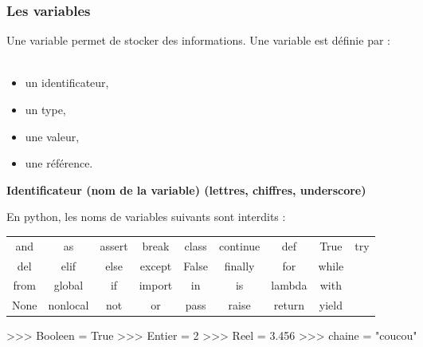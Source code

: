 \begin{frame}[fragile]
\frametitle{Les variables}

Une variable permet de stocker des informations. Une variable est définie par :
\\ ~\ \\
\begin{minipage}{0.45\linewidth}
\begin{itemize}
 \item un identificateur,
 \item un type,
\end{itemize}
\end{minipage}\hfill
\begin{minipage}{0.45\linewidth}
\begin{itemize}
 \item une valeur,
 \item une référence.
\end{itemize}
\end{minipage}

\textbf{Identificateur (nom de la variable) (lettres, chiffres, underscore)}
\begin{rem}
En python, les noms de variables suivants sont interdits :
\begin{tabular}{c c c c c c c c c}
and & as & assert & break & class & continue & def & True & try \\
del & elif & else & except & False & finally & for & while & \\
from & global & if & import & in & is & lambda & with & \\
None & nonlocal & not & or & pass & raise & return & yield & 
\end{tabular}
\end{rem}

\vspace{-0.5cm}

\begin{minipage}{0.4\linewidth}
\begin{GrayBox}[0.9\textwidth]
\begin{verbatimtab}[3]
>>> Booleen = True
>>> Entier = 2
>>> Reel = 3.456
>>> chaine = "coucou"
\end{verbatimtab}
\end{GrayBox}
\end{minipage}\hfill
\begin{minipage}{0.4\linewidth}
\end{minipage}


\end{frame}



